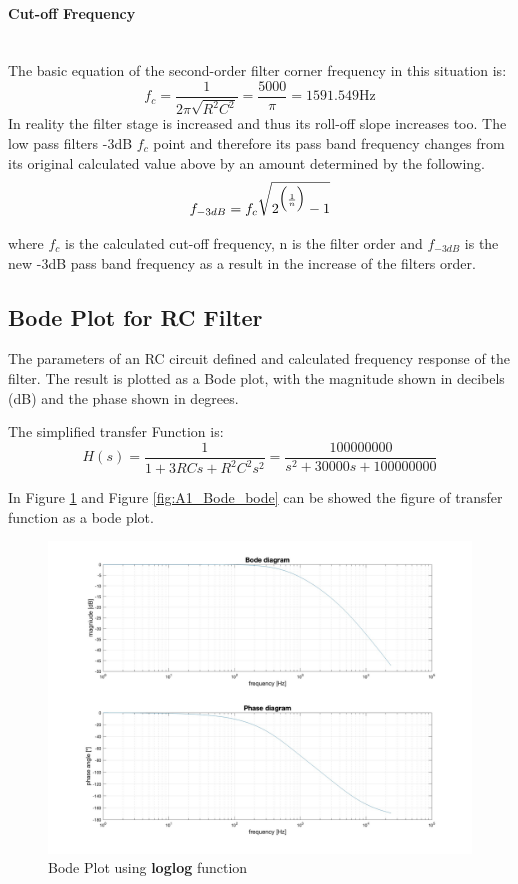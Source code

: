 \documentclass[
	a4paper,
	11pt,
]{article}
\begin{document}
\paragraph{Cut-off Frequency}\mbox{}\\
The basic equation of the second-order filter corner frequency in this situation is:
\begin{equation}
    f_c = \frac{1}{2 \pi \sqrt{R^2 C^2}} = \frac{5000}{\pi} = 1591.549 \mbox{Hz}
\end{equation}
In reality the filter stage is increased and thus its roll-off slope increases too. The low pass filters -3dB \(f_c\) point and therefore its pass band frequency changes from its original calculated value above by an amount determined by the following.
\begin{equation}
    f_{-3dB} = f_c \sqrt{2^{\Bigl( \frac{1}{n}\Bigl)}-1}
\end{equation}

where \(f_c\) is the calculated cut-off frequency, n is the filter order and \(f_{-3dB}\) is the new -3dB pass band frequency as a result in the increase of the filters order.

\subsection{Bode Plot for RC Filter}
The parameters of an RC circuit defined and calculated frequency response of the filter. The result is plotted as a Bode plot, with the magnitude shown in decibels (dB) and the phase shown in degrees.

The simplified transfer Function is:
\begin{equation}
    H(s) = \frac{1}{1+3RCs + R^2C^2s^2} =  \frac{100000000}{s^2+30000s+100000000}
\end{equation}

In Figure \ref{fig:A1_Bode_loglog} and Figure \ref{fig:A1_Bode_bode} can be showed the figure of transfer function as a bode plot.
\begin{figure}[htb!]
    \centerline{\includegraphics[width=13cm]{figure/A1/BodePlot_loglog.jpg}}
    \caption{Bode Plot using \textbf{loglog} function}
    \label{fig:A1_Bode_loglog}
\end{figure}
\end{document}
